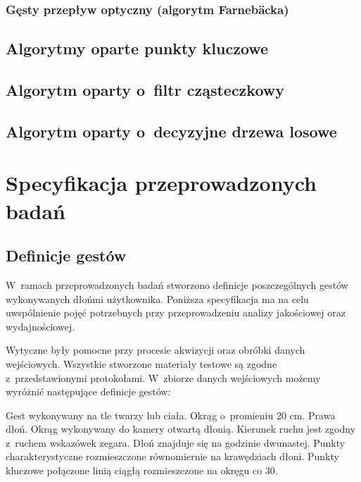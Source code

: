     \subsection{Gęsty przepływ optyczny (algorytm Farnebäcka)}\label{Subsection_DenseOpticalFlow}
    \cite{GunnarFarneback03}

  \section{Algorytmy oparte punkty kluczowe}\label{Subsection_SaliencyKeypoints}
    \cite{SalientPointsTracking05}

  \section{Algorytm oparty o~filtr cząsteczkowy}\label{Subsection_ParticleFilter}
    \cite{ParticleFilter05}
    \cite{FingertipParticleFilter11}

  \section{Algorytm oparty o~decyzyjne drzewa losowe}\label{Subsection_RandomizedTrees}
    \cite{RandomizedTrees06}
    \cite{TwoStageRandomizedTrees11}

\chapter{Specyfikacja przeprowadzonych badań}\label{Chapter_SpecyfikacjaPrzeprowadzonychBadan}

  \section{Definicje gestów}\label{Section_DefinicjeGestow}

    W~ramach przeprowadzonych badań stworzono definicje poszczególnych gestów wykonywanych dłońmi użytkownika. Poniższa specyfikacja ma na celu uwspólnienie pojęć potrzebnych przy przeprowadzeniu analizy jakościowej oraz wydajnościowej.

    Wytyczne były pomocne przy procesie akwizycji oraz obróbki danych wejściowych. Wszystkie stworzone materiały testowe są zgodne z~przedstawionymi protokołami. W~zbiorze danych wejściowych możemy wyróżnić następujące definicje gestów:

         {Gest wykonywany na tle twarzy lub ciała.}
         {Okrąg o~promieniu 20 cm.}
         {Prawa dłoń.}
         {Okrąg wykonywany do kamery otwartą dłonią.}
         {Kierunek ruchu jest zgodny z~ruchem wskazówek zegara.}
         {Dłoń znajduje się na godzinie dwunastej.}
         {Punkty charakterystyczne rozmieszczone równomiernie na krawędziach dłoni.}
         {Punkty kluczowe połączone linią ciągłą rozmieszczone na okręgu co 30\degree.}

